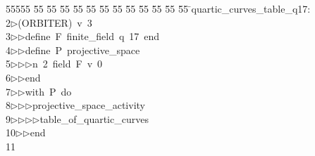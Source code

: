 %
%
\begin{tabbing}
55555 \= 55 \= 55 \= 55 \= 55 \= 55 \= 55 \= 55 \= 55 \= 55 \= 55 \= 55 \= 55 \= \>quartic\_curves\_table\_q17:\ \\[0pt]
2\>$\triangleright$\>(ORBITER)\ v\ 3\ \\[0pt]
3\>$\triangleright$\>$\triangleright$\>define\ F\ finite\_field\ q\ 17\ end\ \\[0pt]
4\>$\triangleright$\>$\triangleright$\>define\ P\ projective\_space\ \\[0pt]
5\>$\triangleright$\>$\triangleright$\>$\triangleright$\>n\ 2\ field\ F\ v\ 0\ \\[0pt]
6\>$\triangleright$\>$\triangleright$\>end\ \\[0pt]
7\>$\triangleright$\>$\triangleright$\>with\ P\ do\ \\[0pt]
8\>$\triangleright$\>$\triangleright$\>$\triangleright$\>projective\_space\_activity\ \\[0pt]
9\>$\triangleright$\>$\triangleright$\>$\triangleright$\>$\triangleright$\>table\_of\_quartic\_curves\ \\[0pt]
10\>$\triangleright$\>$\triangleright$\>end\\[0pt]
11\>\end{tabbing}
